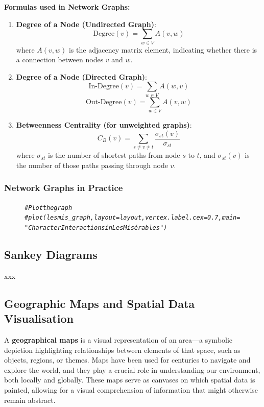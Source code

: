 \documentclass{article}\usepackage[]{graphicx}\usepackage[]{xcolor}
\makeatletter
\newcommand{\hlcom}[1]{\textcolor[rgb]{0.678,0.584,0.686}{\textit{#1}}}%
\newenvironment{kframe}{%
 \def\at@end@of@kframe{}%
 \ifinner\ifhmode%
  \def\at@end@of@kframe{\end{minipage}}%
  \begin{minipage}{\columnwidth}%
 \fi\fi%
 \def\FrameCommand##1{\hskip\@totalleftmargin \hskip-\fboxsep
 \colorbox{shadecolor}{##1}\hskip-\fboxsep
     \hskip-\linewidth \hskip-\@totalleftmargin \hskip\columnwidth}%
 \MakeFramed {\advance\hsize-\width
   \@totalleftmargin\z@ \linewidth\hsize
   \@setminipage}}%
 {\par\unskip\endMakeFramed%
 \at@end@of@kframe}
\newenvironment{knitrout}{}{} %
\makeatother
\begin{document}
\noindent
\textbf{Formulas used in Network Graphs:}

\begin{enumerate}
\item \textbf{Degree of a Node (Undirected Graph)}:
\[
\text{Degree}(v) = \sum_{w \in V} A(v, w)
\]
where \(A(v, w)\) is the adjacency matrix element, indicating whether there is a connection between nodes \(v\) and \(w\).
\item \textbf{Degree of a Node (Directed Graph)}:
\[
\text{In-Degree}(v) = \sum_{w \in V} A(w, v)
\]
\[
\text{Out-Degree}(v) = \sum_{w \in V} A(v, w)
\]
\item \textbf{Betweenness Centrality (for unweighted graphs)}:
\[
C_B(v) = \sum_{s \neq v \neq t} \frac{\sigma_{st}(v)}{\sigma_{st}}
\]
where \(\sigma_{st}\) is the number of shortest paths from node \(s\) to \(t\), and \(\sigma_{st}(v)\) is the number of those paths passing through node \(v\).
\end{enumerate}

\subsubsection{Network Graphs in Practice}




\begin{figure}[h]
\centering
\begin{knitrout}\scriptsize
{}\color{fgcolor}\begin{kframe}
\begin{alltt}
\hlcom{# Plot the graph}
\hlcom{#plot(lesmis_graph, layout = layout, vertex.label.cex = 0.7, main = "Character Interactions in Les Misérables")}
\end{alltt}
\end{kframe}
\end{knitrout}
\end{figure}

\subsection{Sankey Diagrams}
xxx

\subsection{Geographic Maps and Spatial Data Visualisation}

A \textbf{geographical maps} is a visual representation of an area—a symbolic depiction highlighting relationships between elements of that space, such as objects, regions, or themes. Maps have been used for centuries to navigate and explore the world, and they play a crucial role in understanding our environment, both locally and globally. These maps serve as canvases on which spatial data is painted, allowing for a visual comprehension of information that might otherwise remain abstract.\\
\end{document}
